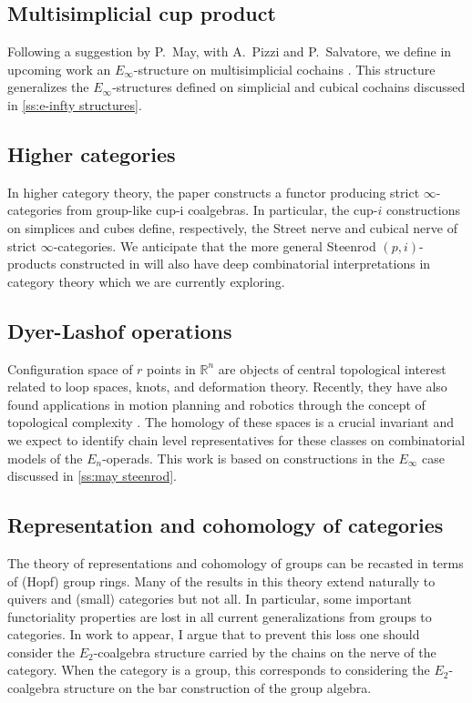 \subsection{Multisimplicial cup product}

Following a suggestion by P.~May, with A.~Pizzi and P.~Salvatore, we define in upcoming work an $E_\infty$-structure on multisimplicial cochains \cite{medina2021multisimplicial}.
This structure generalizes the $E_\infty$-structures defined on simplicial and cubical cochains discussed in \cref{ss:e-infty structures}.

\subsection{Higher categories}

In higher category theory, the paper \cite{medina2020globular} constructs a functor producing strict $\infty$-categories from group-like cup-i coalgebras.
In particular, the cup-$i$ constructions on simplices and cubes define, respectively, the Street nerve and cubical nerve of strict $\infty$-categories.
We anticipate that the more general Steenrod $(p,i)$-products constructed in \cite{medina2020maysteenrod} will also have deep combinatorial interpretations in category theory which we are currently exploring.

\subsection{Dyer-Lashof operations}

Configuration space of $r$ points in $\mathbb R^n$ are objects of central topological interest related to loop spaces, knots, and deformation theory.
Recently, they have also found applications in motion planning and robotics through the concept of topological complexity \cite{farber2003motion.planning}.
The homology of these spaces is a crucial invariant and we expect to identify chain level representatives for these classes on combinatorial models of the $E_n$-operads.
This work is based on constructions in the $E_\infty$ case discussed in \cref{ss:may steenrod}.

\subsection{Representation and cohomology of categories}

The theory of representations and cohomology of groups can be recasted in terms of (Hopf) group rings.
Many of the results in this theory extend naturally to quivers and (small) categories but not all.
In particular, some important functoriality properties are lost in all current generalizations from groups to categories.
In work to appear, I argue that to prevent this loss one should consider the $E_2$-coalgebra structure carried by the chains on the nerve of the category.
When the category is a group, this corresponds to considering the $E_2$-coalgebra structure on the bar construction of the group algebra.

